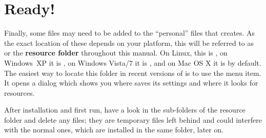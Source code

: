 \section{Ready!}

Finally, some files may need to be added to the ``personal'' files that {\Tw} creates. As the exact location of these depends on your platform, this will be referred to as  or the \textbf{{\Tw} resource folder} throughout this manual. On Linux, this is , on Windows~XP it is , on Windows Vista/7 it is , and on Mac OS X it is  by default. The easiest way to locate this folder in recent versions of {\Tw} is to use the \submenu{} menu item. It opens a dialog which shows you where {\Tw} saves its settings and where it looks for resources.

After installation and first run, have a look in the sub-folders of the {\Tw} resource folder and delete any  files; they are temporary files left behind and could interfere with the normal ones, which are installed in the same folder, later on.
